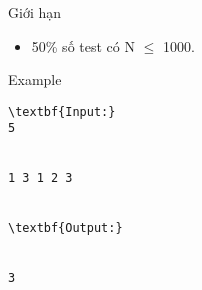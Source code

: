 Giới hạn
\begin{itemize}
	\item     50\% số test có N  $\le$  1000.   
\end{itemize}
Example
\begin{verbatim}
\textbf{Input:}
5


1 3 1 2 3


\textbf{Output:}


3\end{verbatim}